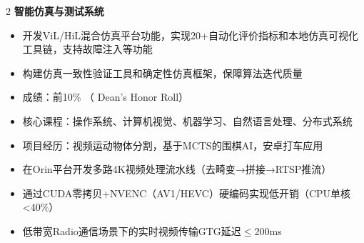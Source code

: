 \documentclass[10pt,a4paper,ragged2e,withhyper]{altacv}
\begin{document}
\begin{paracol}{2}
\textbf{智能仿真与测试系统}
\begin{itemize}
\item 开发ViL/HiL混合仿真平台功能，实现20+自动化评价指标和本地仿真可视化工具链，支持故障注入等功能
\item 构建仿真一致性验证工具和确定性仿真框架，保障算法迭代质量
\end{itemize}






\switchcolumn


\begin{itemize}
\item 成绩：前10\% （ Dean's Honor Roll）
\item 核心课程：操作系统、计算机视觉、机器学习、自然语言处理、分布式系统
\item 项目经历：视频运动物体分割，基于MCTS的围棋AI，安卓打车应用
\end{itemize}






\begin{itemize}
\item 在Orin平台开发多路4K视频处理流水线（去畸变→拼接→RTSP推流）
\item 通过CUDA零拷贝+NVENC（AV1/HEVC）硬编码实现低开销（CPU单核<40\%）
\item 低带宽Radio通信场景下的实时视频传输GTG延迟$\leq$200ms
\end{itemize}


\end{paracol}
\end{document}
